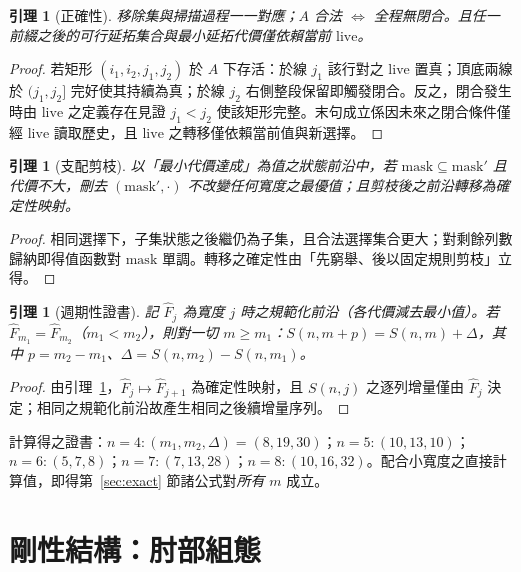 \documentclass[11pt]{ctexart}
\newtheorem{lemma}[theorem]{引理}
\theoremstyle{definition}
\begin{document}
\begin{lemma}[正確性]\label{lem:exact}
移除集與掃描過程一一對應；$A$ 合法 $\iff$ 全程無閉合。且任一前綴之後的可行延拓集合與最小延拓代價僅依賴當前 $\mathrm{live}$。
\end{lemma}

\begin{proof}
若矩形 $(i_1,i_2,j_1,j_2)$ 於 $A$ 下存活：於線 $j_1$ 該行對之 $\mathrm{live}$ 置真；頂底兩線於 $(j_1,j_2]$ 完好使其持續為真；於線 $j_2$ 右側整段保留即觸發閉合。反之，閉合發生時由 $\mathrm{live}$ 之定義存在見證 $j_1<j_2$ 使該矩形完整。末句成立係因未來之閉合條件僅經 $\mathrm{live}$ 讀取歷史，且 $\mathrm{live}$ 之轉移僅依賴當前值與新選擇。
\end{proof}

\begin{lemma}[支配剪枝]\label{lem:prune}
以「最小代價達成」為值之狀態前沿中，若 $\mathrm{mask}\subseteq\mathrm{mask}'$ 且代價不大，刪去 $(\mathrm{mask}',\cdot)$ 不改變任何寬度之最優值；且剪枝後之前沿轉移為確定性映射。
\end{lemma}

\begin{proof}
相同選擇下，子集狀態之後繼仍為子集，且合法選擇集合更大；對剩餘列數歸納即得值函數對 $\mathrm{mask}$ 單調。轉移之確定性由「先窮舉、後以固定規則剪枝」立得。
\end{proof}

\begin{lemma}[週期性證書]\label{lem:cert}
記 $\widehat F_j$ 為寬度 $j$ 時之\emph{規範化}前沿（各代價減去最小值）。若 $\widehat F_{m_1}=\widehat F_{m_2}$（$m_1<m_2$），則對一切 $m\ge m_1$：$S(n,m+p)=S(n,m)+\Delta$，其中 $p=m_2-m_1$、$\Delta=S(n,m_2)-S(n,m_1)$。
\end{lemma}

\begin{proof}
由引理~\ref{lem:prune}，$\widehat F_{j}\mapsto\widehat F_{j+1}$ 為確定性映射，且 $S(n,j)$ 之逐列增量僅由 $\widehat F_j$ 決定；相同之規範化前沿故產生相同之後續增量序列。
\end{proof}

計算得之證書：$n=4:(m_1,m_2,\Delta)=(8,19,30)$；$n=5:(10,13,10)$；$n=6:(5,7,8)$；$n=7:(7,13,28)$；$n=8:(10,16,32)$。配合小寬度之直接計算值，即得第~\ref{sec:exact} 節諸公式對\emph{所有} $m$ 成立。

\section{剛性結構：肘部組態}\label{sec:rigid}
\end{document}
